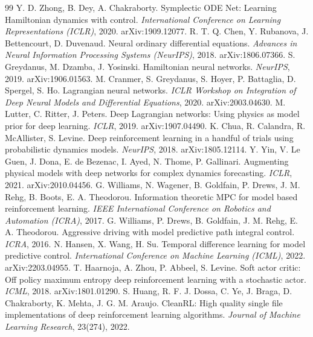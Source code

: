 \documentclass[11pt,a4paper]{article}
\begin{document}
\begin{thebibliography}{99}\small
{} Y. D. Zhong, B. Dey, A. Chakraborty. Symplectic ODE Net: Learning Hamiltonian dynamics with control. \emph{International Conference on Learning Representations (ICLR)}, 2020. arXiv:1909.12077.
 R. T. Q. Chen, Y. Rubanova, J. Bettencourt, D. Duvenaud. Neural ordinary differential equations. \emph{Advances in Neural Information Processing Systems (NeurIPS)}, 2018. arXiv:1806.07366.
 S. Greydanus, M. Dzamba, J. Yosinski. Hamiltonian neural networks. \emph{NeurIPS}, 2019. arXiv:1906.01563.
 M. Cranmer, S. Greydanus, S. Hoyer, P. Battaglia, D. Spergel, S. Ho. Lagrangian neural networks. \emph{ICLR Workshop on Integration of Deep Neural Models and Differential Equations}, 2020. arXiv:2003.04630.
 M. Lutter, C. Ritter, J. Peters. Deep Lagrangian networks: Using physics as model prior for deep learning. \emph{ICLR}, 2019. arXiv:1907.04490.
 K. Chua, R. Calandra, R. McAllister, S. Levine. Deep reinforcement learning in a handful of trials using probabilistic dynamics models. \emph{NeurIPS}, 2018. arXiv:1805.12114.
 Y. Yin, V. Le Guen, J. Dona, E. de Bezenac, I. Ayed, N. Thome, P. Gallinari. Augmenting physical models with deep networks for complex dynamics forecasting. \emph{ICLR}, 2021. arXiv:2010.04456.
 G. Williams, N. Wagener, B. Goldfain, P. Drews, J. M. Rehg, B. Boots, E. A. Theodorou. Information theoretic MPC for model based reinforcement learning. \emph{IEEE International Conference on Robotics and Automation (ICRA)}, 2017.
 G. Williams, P. Drews, B. Goldfain, J. M. Rehg, E. A. Theodorou. Aggressive driving with model predictive path integral control. \emph{ICRA}, 2016.
 N. Hansen, X. Wang, H. Su. Temporal difference learning for model predictive control. \emph{International Conference on Machine Learning (ICML)}, 2022. arXiv:2203.04955.
 T. Haarnoja, A. Zhou, P. Abbeel, S. Levine. Soft actor critic: Off policy maximum entropy deep reinforcement learning with a stochastic actor. \emph{ICML}, 2018. arXiv:1801.01290.
 S. Huang, R. F. J. Dossa, C. Ye, J. Braga, D. Chakraborty, K. Mehta, J. G. M. Araujo. CleanRL: High quality single file implementations of deep reinforcement learning algorithms. \emph{Journal of Machine Learning Research}, 23(274), 2022.

\end{thebibliography}
\end{document}
